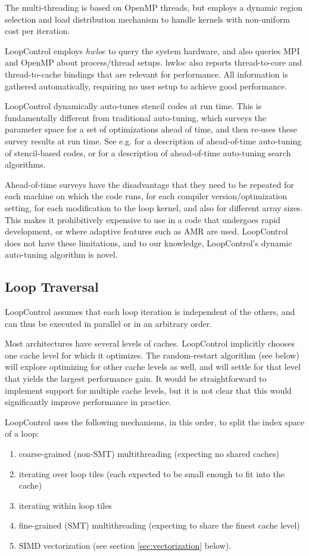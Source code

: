 \documentclass[conference]{IEEEtran}
\begin{document}
The multi-threading is based on OpenMP threads, but employs a dynamic
region selection and load distribution mechanism to handle kernels
with non-uniform cost per iteration.

LoopControl employs \emph{hwloc} \cite{hwlocweb} to query the system
hardware, and also queries MPI and OpenMP about process/thread setups.
hwloc also reports thread-to-core and thread-to-cache
bindings that are relevant for performance. All information is
gathered automatically, requiring no user setup to achieve good
performance.

LoopControl dynamically auto-tunes stencil codes at run time. This is
fundamentally different from traditional auto-tuning, which surveys
the parameter space for a set of optimizations ahead of time, and then
re-uses these survey results at run time. See e.g. \cite{Datta2008}
for a description of ahead-of-time auto-tuning of stencil-based codes, or
\cite{Balaprakasha2011} for a description of ahead-of-time
auto-tuning search algorithms.

Ahead-of-time surveys have the disadvantage that they need to be
repeated for each machine on which the code runs, for each compiler
version/optimization setting, for each modification to the loop
kernel, and also for different array sizes. This makes it prohibitively
expensive to use in a code that undergoes rapid development, or where
adaptive features such as AMR are used. LoopControl does not have
these limitations, and to our knowledge, LoopControl's dynamic
auto-tuning algorithm is novel.

\subsection{Loop Traversal}

LoopControl assumes that each loop iteration is independent of the
others, and can thus be executed in parallel or in an arbitrary order.


Most architectures have several levels of caches. LoopControl
implicitly chooses one cache level for which it optimizes. The
random-restart algorithm (see below) will explore optimizing for other cache
levels as well, and will settle for that level that yields the largest
performance gain. It would be straightforward to implement support for
multiple cache levels, but it is not clear that this would
significantly improve
performance in practice.

LoopControl uses the following mechanisms, in this order, to split the
index space of a loop:
\begin{enumerate}
\item coarse-grained (non-SMT) multithreading (expecting no shared
  caches)
\item iterating over loop tiles (each expected to be small enough to
  fit into the cache)
\item iterating within loop tiles
\item fine-grained (SMT) multithreading (expecting to share the finest
  cache level)
\item SIMD vectorization (see section \ref{sec:vectorization} below).
\end{enumerate}
\end{document}
